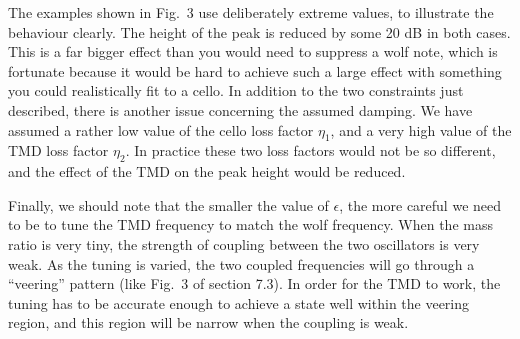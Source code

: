   The examples shown in Fig.\ 3 use deliberately extreme values, to illustrate 
  the behaviour clearly. The height of the peak is reduced by some 20 dB in 
  both cases. This is a far bigger effect than you would need to suppress a 
  wolf note, which is fortunate because it would be hard to achieve such a 
  large effect with something you could realistically fit to a cello. In 
  addition to the two constraints just described, there is another issue 
  concerning the assumed damping. We have assumed a rather low value of the 
  cello loss factor $\eta_1$, and a very high value of the TMD loss factor 
  $\eta_2$. In practice these two loss factors would not be so different, and 
  the effect of the TMD on the peak height would be reduced. 

  Finally, we should note that the smaller the value of $\epsilon$, the more 
  careful we need to be to tune the TMD frequency to match the wolf frequency. 
  When the mass ratio is very tiny, the strength of coupling between the two 
  oscillators is very weak. As the tuning is varied, the two coupled 
  frequencies will go through a ``veering'' pattern (like Fig.\ 3 of section 
  7.3). In order for the TMD to work, the tuning has to be accurate enough to 
  achieve a state well within the veering region, and this region will be 
  narrow when the coupling is weak. 
